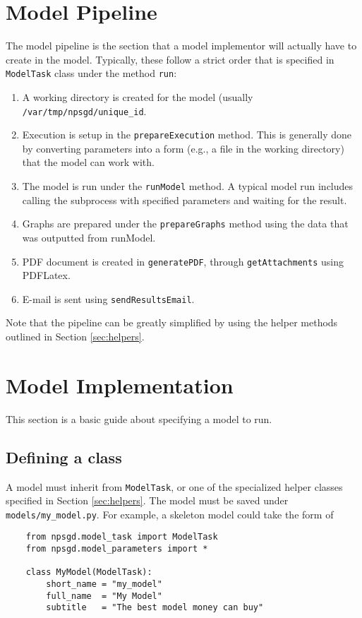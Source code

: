 \documentclass{article}
\newcommand{\mpath}[1]{\texttt{#1}}
\newcommand{\mclass}[1]{\texttt{#1}}
\newcommand{\mmethod}[1]{\texttt{#1}}
\begin{document}
\section{Model Pipeline}
\label{sec:ModelPipeline}
The model pipeline is the section that a model implementor will actually have to
create in the model. Typically, these follow a strict order that is specified in
\mclass{ModelTask} class under the method \mmethod{run}:
\begin{enumerate}
    \item A working directory is created for the model (usually
    \mpath{/var/tmp/npsgd/unique\_id}. 
    \item Execution is setup in the \mmethod{prepareExecution} method. This is
    generally done by converting parameters into a form (e.g., a file in the
    working directory) that the model can work with.
    \item The model is run under the \mmethod{runModel} method. A typical model
    run includes calling the subprocess with specified parameters and waiting
    for the result.
    \item Graphs are prepared under the \mmethod{prepareGraphs} method using the
    data that was outputted from runModel.
    \item PDF document is created in \mmethod{generatePDF}, through
    \mmethod{getAttachments} using PDFLatex. 
    \item E-mail is sent using \mmethod{sendResultsEmail}.
\end{enumerate}

Note that the pipeline can be greatly simplified by using the helper methods
outlined in Section \ref{sec:helpers}.

\section{Model Implementation}
This section is a basic guide about specifying a model to run.

\subsection{Defining a class}
A model must inherit from \mclass{ModelTask}, or one of
the specialized helper classes specified in Section \ref{sec:helpers}. The model
must be saved under \mpath{models/my\_model.py}. For example, a skeleton
model could take the form of
\begin{lstlisting}
    from npsgd.model_task import ModelTask
    from npsgd.model_parameters import *

    class MyModel(ModelTask):
        short_name = "my_model"
        full_name  = "My Model"
        subtitle   = "The best model money can buy"
\end{lstlisting}
\end{document}
